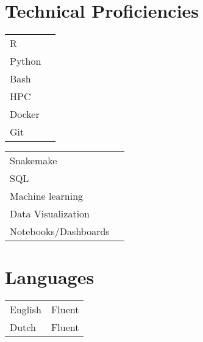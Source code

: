 \documentclass[a4paper,10pt]{article}
\begin{document}
\noindent
\begin{minipage}[t]{0.6\textwidth}
  \section*{Technical Proficiencies}
  \begin{multicols}{2}
    \begin{tabular}{ll}
      R       & \SkillBull{$\bullet\bullet\bullet\bullet\bullet$} \\
      Python  & \SkillBull{$\bullet\bullet\bullet\bullet\circ$} \\
      Bash    & \SkillBull{$\bullet\bullet\bullet\bullet\bullet$} \\
      HPC    & \SkillBull{$\bullet\bullet\bullet\bullet\bullet$} \\
      Docker    & \SkillBull{$\bullet\bullet\bullet\circ\circ$} \\
      Git    & \SkillBull{$\bullet\bullet\bullet\bullet\circ$} \\
    \end{tabular}

    \vfill\null \columnbreak

    \begin{tabular}{ll}
      Snakemake    & \SkillBull{$\bullet\bullet\bullet\bullet\bullet$} \\
      SQL    & \SkillBull{$\bullet\bullet\circ\circ\circ$} \\
      Machine learning    & \SkillBull{$\bullet\bullet\bullet\bullet\circ$} \\
      Data Visualization    & \SkillBull{$\bullet\bullet\bullet\bullet\bullet$} \\
      Notebooks/Dashboards    & \SkillBull{$\bullet\bullet\bullet\bullet\bullet$} \\
    \end{tabular}
  \end{multicols}
\end{minipage}
\hfill
\noindent
\begin{minipage}[t]{.3\textwidth}
\section*{Languages}
\begin{tabular}{ll}
  English & Fluent \\
  Dutch   & Fluent \\
\end{tabular}
\end{minipage}

\LastUpdate
\end{document}
